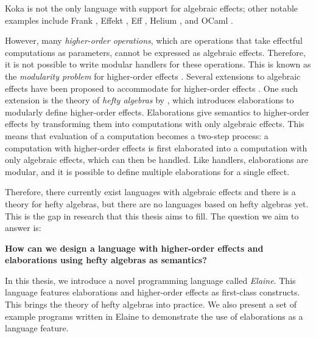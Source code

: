 Koka is not the only language with support for algebraic effects; other notable examples include Frank \autocite{lindley_be_2017}, Effekt \autocite{brachthauser_effects_2020}, Eff \autocite{bauer_programming_2015}, Helium \autocite{biernacki_abstracting_2019}, and OCaml \autocite{sivaramakrishnan_retrofitting_2021}.

However, many \emph{higher-order operations}, which are operations that take effectful computations as parameters, cannot be expressed as algebraic effects. Therefore, it is not possible to write modular handlers for these operations. This is known as the \emph{modularity problem} for higher-order effects \autocite{wu_effect_2014}. Several extensions to algebraic effects have been proposed to accommodate for higher-order effects \autocite{wu_effect_2014,oh_latent_2021}. One such extension is the theory of \emph{hefty algebras} by \textcite{bach_poulsen_hefty_2023}, which introduces elaborations to modularly define higher-order effects. Elaborations give semantics to higher-order effects by transforming them into computations with only algebraic effects. This means that evaluation of a computation becomes a two-step process: a computation with higher-order effects is first elaborated into a computation with only algebraic effects, which can then be handled. Like handlers, elaborations are modular, and it is possible to define multiple elaborations for a single effect.

Therefore, there currently exist languages with algebraic effects and there is a theory for hefty algebras, but there are no languages based on hefty algebras yet. This is the gap in research that this thesis aims to fill. The question we aim to answer is:
\begin{center}
\textbf{How can we design a language with higher-order effects and elaborations using hefty algebras as semantics?}
\end{center}
In this thesis, we introduce a novel programming language called \emph{Elaine}. This language features elaborations and higher-order effects as first-class constructs. This brings the theory of hefty algebras into practice. We also present a set of example programs written in Elaine to demonstrate the use of elaborations as a language feature.

